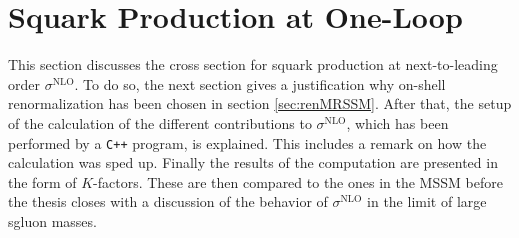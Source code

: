 \section{Squark Production at One-Loop}
This section discusses the cross section for squark production at next-to-leading order $\sigma^{\mathrm{NLO}}$. To do so, the next section gives a justification why on-shell renormalization has been chosen in section \ref{sec:renMRSSM}. After that, the setup of the calculation of the different contributions to $\sigma^{\mathrm{NLO}}$, which has been performed by a \texttt{C++} program, is explained. This includes a remark on how the calculation was sped up. Finally the results of the computation are presented in the form of $K$-factors. These are then compared to the ones in the MSSM before the thesis closes with a discussion of the behavior of $\sigma^{\mathrm{NLO}}$ in the limit of large sgluon masses.

